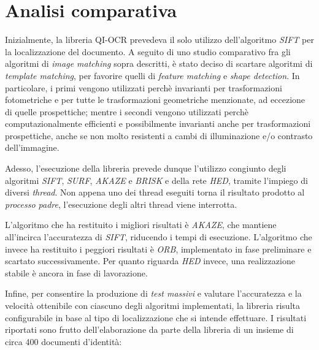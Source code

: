 \section{Analisi comparativa}
\label{sec:image-matching-comparison}
Inizialmente, la libreria QI-OCR prevedeva il solo utilizzo dell'algoritmo \textit{SIFT} per la localizzazione del documento. A seguito di uno studio comparativo fra gli algoritmi di \textit{image matching} sopra descritti, \`e stato deciso di scartare algoritmi di \textit{template matching}, per favorire quelli di \textit{feature matching} e \textit{shape detection}. In particolare, i primi vengono utilizzati perch\`e invarianti per trasformazioni fotometriche e per tutte le trasformazioni geometriche menzionate, ad eccezione di quelle prospettiche; mentre i secondi vengono utilizzati perch\`e computazionalmente efficienti e possibilmente invarianti anche per trasformazioni prospettiche, anche se non molto resistenti a cambi di illuminazione e/o contrasto dell'immagine.\par
Adesso, l'esecuzione della libreria prevede dunque l'utilizzo congiunto degli algoritmi \textit{SIFT}, \textit{SURF}, \textit{AKAZE} e \textit{BRISK} e della rete \textit{HED}, tramite l'impiego di diversi \textit{thread}. Non appena uno dei thread eseguiti torna il risultato prodotto al \textit{processo padre}, l'esecuzione degli altri thread viene interrotta.\par
L'algoritmo che ha restituito i migliori risultati \`e \textit{AKAZE}, che mantiene all'incirca l'accuratezza di \textit{SIFT}, riducendo i tempi di esecuzione. L'algoritmo che invece ha restituito i peggiori risultati \`e \textit{ORB}, implementato in fase preliminare e scartato successivamente. Per quanto riguarda \textit{HED} invece, una realizzazione stabile \`e ancora in fase di lavorazione.\par
Infine, per consentire la produzione di \textit{test massivi} e valutare l'accuratezza e la velocit\`a ottenibile con ciascuno degli algoritmi implementati, la libreria risulta configurabile in base al tipo di localizzazione che si intende effettuare. I risultati riportati sono frutto dell'elaborazione da parte della libreria di un insieme di circa 400 documenti d'identit\`a: 
\begin{table}[H]
	\centering
	\caption{Analisi comparativa algoritmi di \textit{feature matching}}
	\label{tab:feature-matching-comparison}
\end{table}
